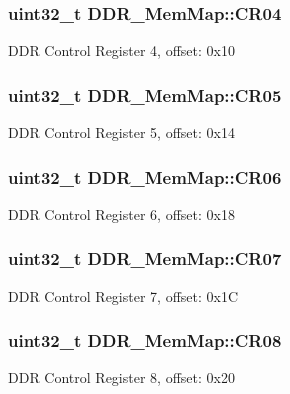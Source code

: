 \subsubsection[{C\+R04}]{\setlength{\rightskip}{0pt plus 5cm}uint32\+\_\+t D\+D\+R\+\_\+\+Mem\+Map\+::\+C\+R04}\label{struct_d_d_r___mem_map_a01670a4f2214c3e8d43ddcc88b66bf63}
D\+D\+R Control Register 4, offset\+: 0x10 \hypertarget{struct_d_d_r___mem_map_a13bdb8afba015908d30885298c47261c}{}
\subsubsection[{C\+R05}]{\setlength{\rightskip}{0pt plus 5cm}uint32\+\_\+t D\+D\+R\+\_\+\+Mem\+Map\+::\+C\+R05}\label{struct_d_d_r___mem_map_a13bdb8afba015908d30885298c47261c}
D\+D\+R Control Register 5, offset\+: 0x14 \hypertarget{struct_d_d_r___mem_map_a3c8bfa47279aca171819027f1da87abb}{}
\subsubsection[{C\+R06}]{\setlength{\rightskip}{0pt plus 5cm}uint32\+\_\+t D\+D\+R\+\_\+\+Mem\+Map\+::\+C\+R06}\label{struct_d_d_r___mem_map_a3c8bfa47279aca171819027f1da87abb}
D\+D\+R Control Register 6, offset\+: 0x18 \hypertarget{struct_d_d_r___mem_map_a7a21cb4617532dbd071b15ca7874a6c3}{}
\subsubsection[{C\+R07}]{\setlength{\rightskip}{0pt plus 5cm}uint32\+\_\+t D\+D\+R\+\_\+\+Mem\+Map\+::\+C\+R07}\label{struct_d_d_r___mem_map_a7a21cb4617532dbd071b15ca7874a6c3}
D\+D\+R Control Register 7, offset\+: 0x1\+C \hypertarget{struct_d_d_r___mem_map_a663b17c8696f979ed804d4aee9048f8a}{}
\subsubsection[{C\+R08}]{\setlength{\rightskip}{0pt plus 5cm}uint32\+\_\+t D\+D\+R\+\_\+\+Mem\+Map\+::\+C\+R08}\label{struct_d_d_r___mem_map_a663b17c8696f979ed804d4aee9048f8a}
D\+D\+R Control Register 8, offset\+: 0x20 \hypertarget{struct_d_d_r___mem_map_a29563dba3e22c074a37699e7210938dc}{}
